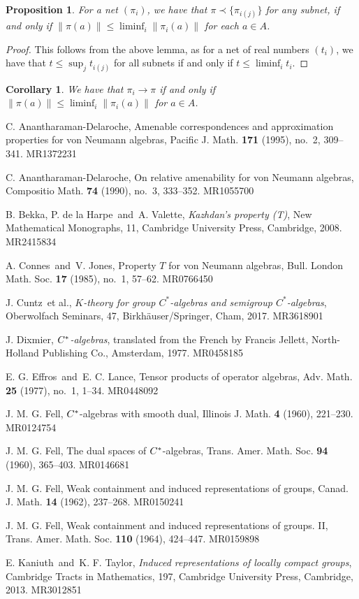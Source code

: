 \documentclass[a4paper,11pt]{article}
\newtheorem{proposition}[lemma]{Proposition}
\newtheorem{corollary}[lemma]{Corollary}
\begin{document}
\begin{proposition}
For a net $(\pi_i)$, we have that $\pi\prec\{\pi_{i(j)}\}$ for any subnet,
if and only if $\|\pi(a)\|\leq\liminf_i \|\pi_i(a)\|$ for each $a\in A$.
\end{proposition}
\begin{proof}
This follows from the above lemma, as for a net of real numbers $(t_i)$, we have
that $t\leq\sup_j t_{i(j)}$ for all subnets if and only if $t\leq\liminf_i t_i$.
\end{proof}

\begin{corollary}
We have that $\pi_i\rightarrow \pi$ if and only if $\|\pi(a)\| \leq
\liminf_i \|\pi_i(a)\|$ for $a\in A$.
\end{corollary}


\begin{thebibliography}{99}

 C. Anantharaman-Delaroche, Amenable correspondences and approximation properties for von Neumann algebras, Pacific J. Math. {\bf 171} (1995), no.~2, 309--341. MR1372231

 C. Anantharaman-Delaroche, On relative amenability for von Neumann algebras, Compositio Math. {\bf 74} (1990), no.~3, 333--352. MR1055700

 B. Bekka, P. de la Harpe\ and\ A. Valette, {\it Kazhdan's property (T)}, New Mathematical Monographs, 11, Cambridge University Press, Cambridge, 2008. MR2415834

 A. Connes\ and\ V. Jones, Property $T$ for von Neumann algebras, Bull. London Math. Soc. {\bf 17} (1985), no.~1, 57--62. MR0766450

 J. Cuntz\ et al., {\it $K$-theory for group $C^*$-algebras and semigroup $C^*$-algebras}, Oberwolfach Seminars, 47, Birkh\"{a}user/Springer, Cham, 2017. MR3618901

 J. Dixmier, {\it $C\sp*$-algebras}, translated from the French by Francis Jellett, North-Holland Publishing Co., Amsterdam, 1977. MR0458185

 E. G. Effros\ and\ E. C. Lance, Tensor products of operator algebras, Adv. Math. {\bf 25} (1977), no.~1, 1--34. MR0448092

 J. M. G. Fell, $C\sp{\ast} $-algebras with smooth dual, Illinois J. Math. {\bf 4} (1960), 221--230. MR0124754

 J. M. G. Fell, The dual spaces of $C\sp{\ast} $-algebras, Trans. Amer. Math. Soc. {\bf 94} (1960), 365--403. MR0146681

 J. M. G. Fell, Weak containment and induced representations of groups, Canad. J. Math. {\bf 14} (1962), 237--268. MR0150241

 J. M. G. Fell, Weak containment and induced representations of groups. II, Trans. Amer. Math. Soc. {\bf 110} (1964), 424--447. MR0159898

 E. Kaniuth\ and\ K. F. Taylor, {\it Induced representations of locally compact groups}, Cambridge Tracts in Mathematics, 197, Cambridge University Press, Cambridge, 2013. MR3012851

\end{thebibliography}
\end{document}
